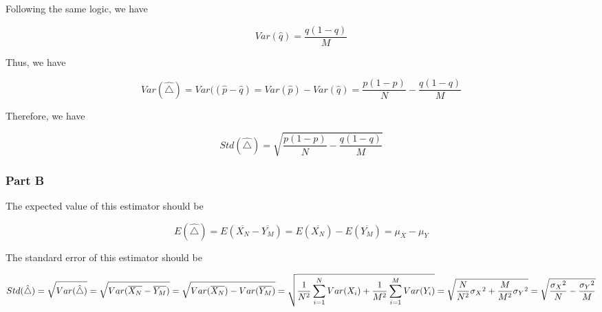 \documentclass[
]{article}
\begin{document}
Following the same logic, we have

\[
Var(\hat{q}) =\frac{q(1-q)}{M}
\]

Thus, we have

\[
Var(\hat{\triangle})= Var((\hat{p}-\hat{q})=Var(\hat{p})-Var(\hat{q}) = \frac{p(1-p)}{N}-\frac{q(1-q)}{M}
\]

Therefore, we have

\[
Std(\hat{\triangle}) = \sqrt{\frac{p(1-p)}{N}-\frac{q(1-q)}{M}}
\]

\hypertarget{part-b-10}{%
\subsubsection{Part B}\label{part-b-10}}

The expected value of this estimator should be

\[
E(\hat{\triangle}) = E(\overline{X_N}-\overline{Y_M})=E(\overline{X_N})-E(\overline{Y_M})=\mu_X-\mu_Y
\]

The standard error of this estimator should be

\[
Std(\hat{\triangle}) = \sqrt{Var(\hat{\triangle})}=\sqrt{Var(\overline{X_N}-\overline{Y_M})}=\sqrt{Var(\overline{X_N})-Var(\overline{Y_M})}\\=\sqrt{\frac{1}{N^2}\sum_{i=1}^{N}Var(X_i)+\frac{1}{M^2}\sum_{i=1}^{M}Var(Y_i)}=\sqrt{\frac{N}{N^2}{\sigma_X}^2+\frac{M}{M^2}{\sigma_Y}^2}=\sqrt{\frac{{\sigma_X}^2}{N}-\frac{{\sigma_Y}^2}{M}}
\]

  
\end{document}
